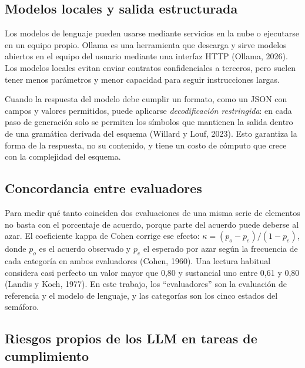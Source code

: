 \documentclass[12pt,letterpaper]{article}
\begin{document}
\subsection{Modelos locales y salida estructurada}

Los modelos de lenguaje pueden usarse mediante servicios en la nube o ejecutarse en un equipo propio. Ollama es una herramienta que descarga y sirve modelos abiertos en el equipo del usuario mediante una interfaz HTTP (Ollama, 2026). Los modelos locales evitan enviar contratos confidenciales a terceros, pero suelen tener menos parámetros y menor capacidad para seguir instrucciones largas.

Cuando la respuesta del modelo debe cumplir un formato, como un JSON con campos y valores permitidos, puede aplicarse \emph{decodificación restringida}: en cada paso de generación solo se permiten los símbolos que mantienen la salida dentro de una gramática derivada del esquema (Willard y Louf, 2023). Esto garantiza la forma de la respuesta, no su contenido, y tiene un costo de cómputo que crece con la complejidad del esquema.

\subsection{Concordancia entre evaluadores}

Para medir qué tanto coinciden dos evaluaciones de una misma serie de elementos no basta con el porcentaje de acuerdo, porque parte del acuerdo puede deberse al azar. El coeficiente kappa de Cohen corrige ese efecto: $\kappa = (p_o - p_e)/(1 - p_e)$, donde $p_o$ es el acuerdo observado y $p_e$ el esperado por azar según la frecuencia de cada categoría en ambos evaluadores (Cohen, 1960). Una lectura habitual considera casi perfecto un valor mayor que 0,80 y sustancial uno entre 0,61 y 0,80 (Landis y Koch, 1977). En este trabajo, los ``evaluadores'' son la evaluación de referencia y el modelo de lenguaje, y las categorías son los cinco estados del semáforo.

\subsection{Riesgos propios de los LLM en tareas de cumplimiento}
\end{document}
